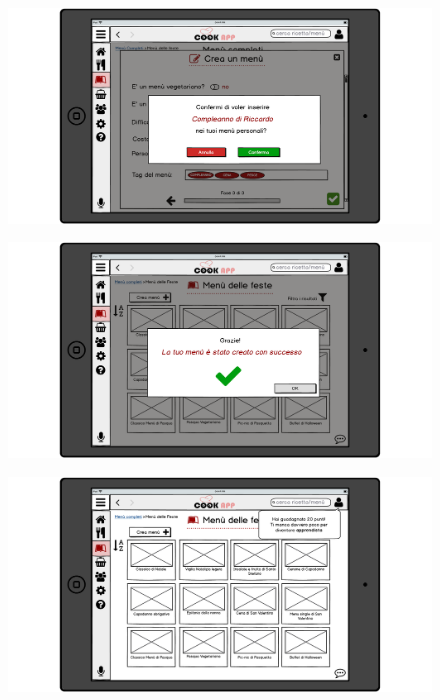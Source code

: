 \begin{itemize}
\begin{figure}[H]
\end{figure}
\begin{figure}[H]
	\centering
	\includegraphics[width=0.95\linewidth]{img/mockup/menu-crea-5.png}
\end{figure}
\begin{figure}[H]
	\centering
	\includegraphics[width=0.95\linewidth]{img/mockup/menu-crea-6.png}
\end{figure}
\begin{figure}[H]
	\centering
	\includegraphics[width=0.95\linewidth]{img/mockup/menu-crea-7.png}
\end{figure}


\end{itemize}
